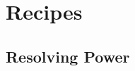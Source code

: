 \documentclass[letterpaper,10pt,english]{sphinxmanual}
\begin{document}
\begin{fulllineitems}
\begin{fulllineitems}
\begin{quote}
\begin{description}
\end{description}\end{quote}

\end{fulllineitems}


\end{fulllineitems}



\section{Recipes}
\label{\detokenize{API:recipes}}

\subsection{Resolving Power}
\label{\detokenize{API:resolving-power}}
\end{document}
